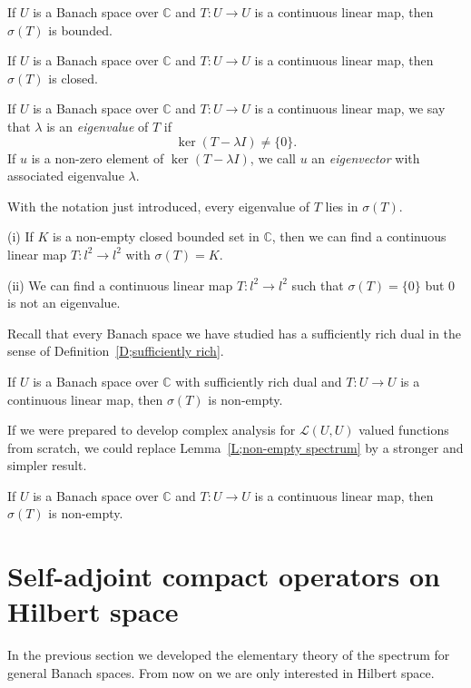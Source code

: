 \begin{lemma}  If $U$ is a Banach space over ${\mathbb C}$
and $T:U\rightarrow U$ is a continuous linear map, then
$\sigma(T)$ is bounded.
\end{lemma}
\begin{lemma}  If $U$ is a Banach space over ${\mathbb C}$
and $T:U\rightarrow U$ is a continuous linear map,
then $\sigma(T)$ is closed.
\end{lemma}
\begin{definition} If $U$ is a Banach space over ${\mathbb C}$
and $T:U\rightarrow U$ is a continuous linear map, we say
that $\lambda$ is an \emph{eigenvalue} of $T$ if
\[\ker(T-\lambda I)\neq \{0\}.\]
If $u$ is a non-zero element of $\ker(T-\lambda I)$,
we call $u$ an \emph{eigenvector} with 
associated eigenvalue $\lambda$.
\end{definition}
\begin{exercise} With the notation just introduced,
every eigenvalue of $T$ lies in $\sigma(T)$.
\end{exercise}
\begin{example} (i) If $K$ is a non-empty closed bounded set in
${\mathbb C}$, then we can find a continuous linear map
$T:l^{2}\rightarrow l^{2}$ with $\sigma(T)=K$.

(ii) We can find a continuous linear map
$T:l^{2}\rightarrow l^{2}$ such that $\sigma(T)=\{0\}$
but $0$ is not an eigenvalue.
\end{example}
Recall that every Banach space we have studied has
a sufficiently rich dual in the sense of 
Definition~\ref{D;sufficiently rich}.
\begin{lemma}\label{L;non-empty spectrum} 
If $U$ is a Banach space over ${\mathbb C}$
with sufficiently rich dual
and $T:U\rightarrow U$ is a continuous linear map,
then $\sigma(T)$ is non-empty.
\end{lemma}
If we were prepared to develop complex analysis for ${\mathcal L}(U,U)$
valued functions from scratch, we could replace
Lemma~\ref{L;non-empty spectrum}
by a stronger and simpler result.
\begin{lemma} 
If $U$ is a Banach space over ${\mathbb C}$
and $T:U\rightarrow U$ is a continuous linear map,
then $\sigma(T)$ is non-empty.
\end{lemma}
\section{Self-adjoint compact operators on Hilbert space}
In the previous section we developed the elementary theory
of the spectrum for general Banach spaces. From now on we
are only interested in Hilbert space.


